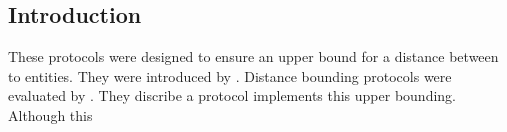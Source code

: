 
\subsection{Introduction}

	These protocols were designed to ensure an upper bound for a distance between to entities.
	They were introduced by \citeauthor{distanceBoundingProtocols}.
	Distance bounding protocols were evaluated by \citeauthor{secPos}.
	They discribe a protocol implements this upper bounding.
	Although this 

